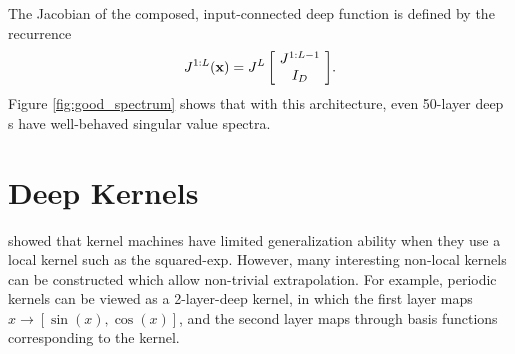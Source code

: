 %
%
%
The Jacobian of the composed, input-connected deep function is defined by the recurrence
%
\newcommand{\sbi}[2]{\left[ \! \begin{array}{c} #1 \\ #2 \end{array} \! \right]} 
\begin{align}
{J^{1:L}(\vx) = J^L \sbi{ J^{1:L-1}}{I_D}}.
\end{align}
%
%
%
Figure \ref{fig:good_spectrum} shows that with this architecture, even 50-layer deep \gp{}s have well-behaved singular value spectra.














\section{Deep Kernels}
\label{sec:deep_kernels}


\cite{ bengio2006curse} showed that kernel machines have limited generalization ability when they use a local kernel such as the squared-exp.
However, many interesting non-local kernels can be constructed which allow non-trivial extrapolation.
For example, periodic kernels can be viewed as a 2-layer-deep kernel, in which the first layer maps $x \rightarrow [\sin(x), \cos(x)]$, and the second layer maps through basis functions corresponding to the  kernel.

